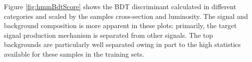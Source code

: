 Figure \ref{fig:hmmBdtScore} shows the BDT discriminant calculated in different categories and scaled by the samples cross-section and luminosity.
The signal and background composition is more apparent in these plots: primarily, the target signal production mechanism is separated from other signals.
The top backgrounds are particularly well separated owing in part to the high statistics available for these samples in the training sets.

 
